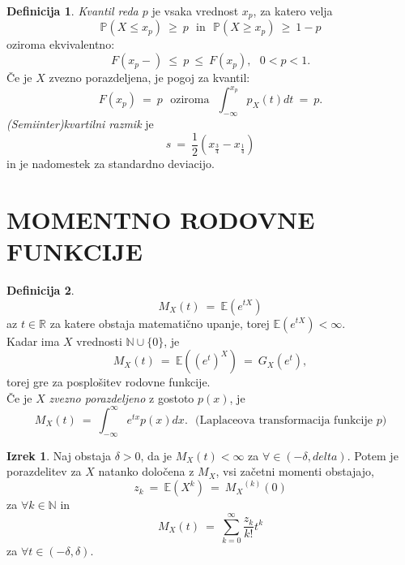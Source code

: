 \documentclass[11pt]{article}
\theoremstyle{definition}
\newtheorem{definicija}{Definicija}[section]
\theoremstyle{definition}
\theoremstyle{definition}
\newtheorem{izrek}{Izrek}[section]
\begin{document}
\begin{definicija}

\textit{Kvantil reda $p$} je vsaka vrednost $x_p$, za katero velja
$$\mathbb{P}(X \leq x_p) ~\geq~ p ~~~\text{in}~~~ \mathbb{P}(X \geq x_p) ~\geq~ 1 - p$$
oziroma ekvivalentno:
$$F(x_p-) ~\leq~ p ~\leq~ F(x_p), ~~~0 < p < 1.$$
Če je $X$ zvezno porazdeljena, je pogoj za kvantil:
$$F(x_p) ~=~ p ~~~\text{oziroma}~~~ \int_{-\infty}^{x_p} p_X(t) dt ~=~ p.$$
\textit{(Semiinter)kvartilni razmik} je
$$s ~=~ \frac{1}{2}(x_{\frac{3}{4}} - x_{\frac{1}{4}})$$
in je nadomestek za standardno deviacijo.

\end{definicija}
\vspace{0.5cm}


\section{MOMENTNO RODOVNE FUNKCIJE}
\vspace{0.5cm}

\begin{definicija}

$$M_X(t) ~=~ \mathbb{E}(e^{tX})$$
az $t \in \mathbb{R}$ za katere obstaja matematično upanje, torej $\mathbb{E}(e^{tX}) < \infty$. \\

\noindent Kadar ima $X$ vrednosti $\mathbb{N} \cup \{0\}$, je
$$M_X(t) ~=~ \mathbb{E}((e^t)^X) ~=~ G_X(e^t),$$
torej gre za posplošitev rodovne funkcije. \\

\noindent Če je $X$ \textit{zvezno porazdeljeno} z gostoto $p(x)$, je
$$M_X(t) ~=~ \int_{-\infty}^{\infty} e^{tx} p(x) dx. ~~~\text{(Laplaceova transformacija funkcije $p$)}$$

\end{definicija}
\vspace{0.5cm}

\begin{izrek}

Naj obstaja $\delta > 0$, da je $M_X(t) < \infty$ za $\forall \in (-\delta, delta)$. Potem je porazdelitev za $X$ natanko določena z $M_X$, vsi začetni momenti obstajajo,
$$z_k ~=~ \mathbb{E}(X^k) ~=~ {M_X}^{(k)}(0)$$
za $\forall k \in \mathbb{N}$ in
$$M_X(t) ~=~ \sum_{k=0}^{\infty} \frac{z_k}{k!} t^k$$
za $\forall t \in (-\delta, \delta)$.

\end{izrek}
\vspace{0.5cm}
\end{document}
